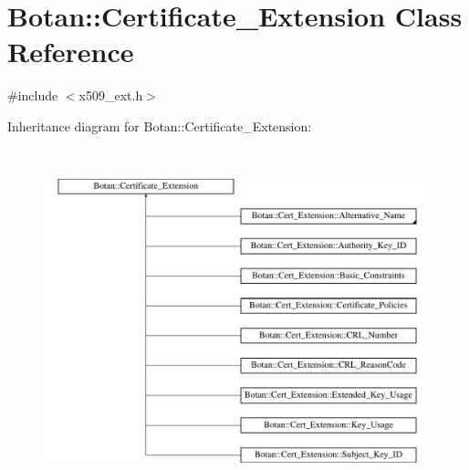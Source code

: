 \hypertarget{classBotan_1_1Certificate__Extension}{\section{Botan\-:\-:Certificate\-\_\-\-Extension Class Reference}
\label{classBotan_1_1Certificate__Extension}
}


{\ttfamily \#include $<$x509\-\_\-ext.\-h$>$}

Inheritance diagram for Botan\-:\-:Certificate\-\_\-\-Extension\-:\begin{figure}[H]
\begin{center}
\leavevmode
\includegraphics[height=10.000000cm]{classBotan_1_1Certificate__Extension}
\end{center}
\end{figure}
